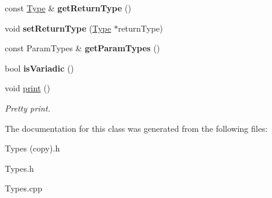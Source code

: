 \begin{DoxyCompactItemize}
\item 
\mbox{\label{classspan_1_1ir_1_1types_1_1FunctionType_a929384ec1910beb0e789c6a48fa7fbbb}} 
const \hyperlink{classspan_1_1ir_1_1types_1_1Type}{Type} \& {\bfseries get\+Return\+Type} ()
\item 
\mbox{\label{classspan_1_1ir_1_1types_1_1FunctionType_a478a9d89ec7decfa32924a305edd6f49}} 
void {\bfseries set\+Return\+Type} (\hyperlink{classspan_1_1ir_1_1types_1_1Type}{Type} $\ast$return\+Type)
\item 
\mbox{\label{classspan_1_1ir_1_1types_1_1FunctionType_a25ad9eeec90afc10caf738dea79e3542}} 
const Param\+Types \& {\bfseries get\+Param\+Types} ()
\item 
\mbox{\label{classspan_1_1ir_1_1types_1_1FunctionType_acc38e969561b21c4517a70b042ce90ed}} 
bool {\bfseries is\+Variadic} ()
\item 
\mbox{\label{classspan_1_1ir_1_1types_1_1FunctionType_aea4df3a03aa85985808a07bd00fb5b4c}} 
void \hyperlink{classspan_1_1ir_1_1types_1_1FunctionType_aea4df3a03aa85985808a07bd00fb5b4c}{print} ()
\begin{DoxyCompactList}\small\item\em Pretty print. \end{DoxyCompactList}\end{DoxyCompactItemize}


The documentation for this class was generated from the following files\+:\begin{DoxyCompactItemize}
\item 
Types (copy).\+h\item 
Types.\+h\item 
Types.\+cpp\end{DoxyCompactItemize}
